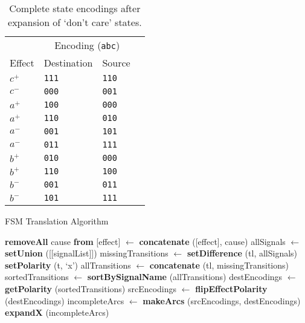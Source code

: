 \begin{table}[ht]
\caption{Complete state encodings after expansion of `don't care' states.}\label{tab:enc_complete}
\centering
\begin{tabular}{@{}llll@{}}
	\toprule
	& \multicolumn{2}{c}{Encoding (\texttt{abc})}\\ \cmidrule(l){2-3}
	Effect & Destination & Source\\ \midrule
	$c^{+}$ & \texttt{111} & \texttt{110}\\[0.25em]
	$c^{-}$ & \texttt{000} & \texttt{001}\\[0.25em]
	$a^{+}$ & \texttt{100} & \texttt{000}\\
	$a^{+}$ & \texttt{110} & \texttt{010}\\[0.25em]
	$a^{-}$ & \texttt{001} & \texttt{101}\\
	$a^{-}$ & \texttt{011} & \texttt{111}\\[0.25em]
	$b^{+}$ & \texttt{010} & \texttt{000}\\
	$b^{+}$ & \texttt{110} & \texttt{100}\\[0.25em]
	$b^{-}$ & \texttt{001} & \texttt{011}\\
	$b^{-}$ & \texttt{101} & \texttt{111}\\
	\bottomrule
\end{tabular}
\end{table}

\begin{algorithm}[ht]
\begin{algorithmic}
	\caption{FSM Translation Algorithm\label{alg:fsm}}
		\State \textbf{removeAll} cause \textbf{from} [effect]
		\State [signalList] $\leftarrow$ \textbf{concatenate} ([effect], cause)
	\EndFor
	\State allSignals $\leftarrow$ \textbf{setUnion} ([[signalList]])
		\State missingTransitions $\leftarrow$ \textbf{setDifference} (tl, allSignals)
			\State \textbf{setPolarity} (t, `x')
		\EndFor
		\State allTransitions $\leftarrow$ \textbf{concatenate} (tl, missingTransitions)
		\State sortedTransitions $\leftarrow$ \textbf{sortBySignalName} (allTransitions)
		\State destEncodings $\leftarrow$ \textbf{getPolarity} (sortedTransitions)
		\State srcEncodings $\leftarrow$ \textbf{flipEffectPolarity} (destEncodings)
		\State incompleteArcs $\leftarrow$ \textbf{makeArcs} (srcEncodings, destEncodings)
		\State \textbf{expandX} (incompleteArcs)
	\EndFor
\end{algorithmic}
\end{algorithm}
